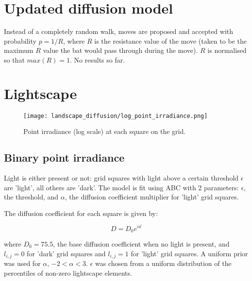 \section{Updated diffusion model}

Instead of a completely random walk, moves are proposed and accepted with probability $p = 1/R$, where $R$ is the resistance value of the move (taken to be the maximum $R$ value the bat would pass through during the move). $R$ is normalised so that $max(R) = 1$.
No results so far.






\section{Lightscape}

\begin{figure} [h]
    \centering
    \texttt{[image: landscape\_diffusion/log\_point\_irradiance.png]}
    \label{fig:point_irradiance}
    \caption{Point irradiance (log scale) at each square on the grid.}
\end{figure}

\subsection{Binary point irradiance}
Light is either present or not: grid squares with light above a certain
threshold $\epsilon$ are 'light', all others are 'dark'. The model is fit using
ABC with 2 parameters: $\epsilon$, the threshold, and $\alpha$, the diffusion
coefficient multiplier for 'light' grid squares.

The diffusion coefficient for each square is given by:

$$D = D_0 e^{\alpha l} $$

where $D_0 = 75.5$, the base diffusion coefficient when no light is present, and
$l_{i,j} = 0$ for 'dark' grid squares and $l_{i,j} = 1$ for 'light' grid
squares. A uniform prior was used for $\alpha$, $-2 < \alpha < 3$. $\epsilon$
was chosen from a uniform distribution of the percentiles of non-zero lightscape
elements.




